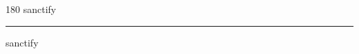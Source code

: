 
\begin{frame}
\begin{center}
\begin{turn}{180}
{\fontsize{2.5cm}{1em}\selectfont sanctify}
\end{turn}
\vspace{1em}\par  
\hrule
\vspace{1em}\par  
{\fontsize{2.5cm}{1em}\selectfont sanctify}
\end{center}
\end{frame}
